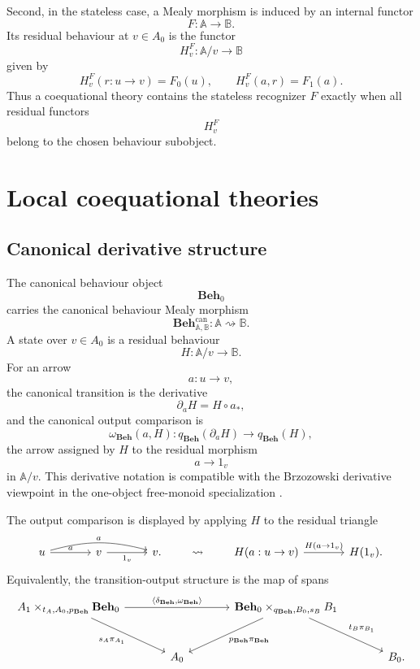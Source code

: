 Second, in the stateless case, a Mealy morphism is induced by an internal
functor
\[
    F:\mathbb A\to\mathbb B.
\]
Its residual behaviour at \(v\in A_0\) is the functor
\[
    H^F_v:\mathbb A/v\to\mathbb B
\]
given by
\[
    H^F_v(r:u\to v)=F_0(u),
    \qquad
    H^F_v(a,r)=F_1(a).
\]
Thus a coequational theory contains the stateless recognizer \(F\) exactly when
all residual functors
\[
    H^F_v
\]
belong to the chosen behaviour subobject.

\section{Local coequational theories}
\label{sec:local-coequational-theories}

\subsection{Canonical derivative structure}
\label{subsec:canonical-derivative-structure}

The canonical behaviour object
\[
    \mathbf{Beh}_0
\]
carries the canonical behaviour Mealy morphism
\[
    \mathbf{Beh}^{\mathrm{can}}_{\mathbb A,\mathbb B}:
    \mathbb A\rightsquigarrow\mathbb B.
\]
A state over \(v\in A_0\) is a residual behaviour
\[
    H:\mathbb A/v\to\mathbb B.
\]
For an arrow
\[
    a:u\to v,
\]
the canonical transition is the derivative
\[
    \partial_aH=H\circ a_*,
\]
and the canonical output comparison is
\[
    \omega_{\mathbf{Beh}}(a,H):
    q_{\mathbf{Beh}}(\partial_aH)\to q_{\mathbf{Beh}}(H),
\]
the arrow assigned by \(H\) to the residual morphism
\[
    a\to 1_v
\]
in \(\mathbb A/v\). This derivative notation is compatible with the
Brzozowski derivative viewpoint in the one-object free-monoid specialization
\cite{Brzozowski1964}.

The output comparison is displayed by applying \(H\) to the residual triangle
\[
\begin{tikzcd}[column sep=large, row sep=large]
    u
        \arrow[r, "a"]
        \arrow[rr, "a", bend left=15]
    &
    v
        \arrow[r, "1_v"']
    &
    v .
\end{tikzcd}
\qquad
\leadsto
\qquad
\begin{tikzcd}[column sep=large, row sep=large]
    H(a:u\to v)
        \arrow[r, "{H(a\to 1_v)}"]
    &
    H(1_v).
\end{tikzcd}
\]
Equivalently, the transition-output structure is the map of spans
\[
\begin{tikzcd}[column sep=large, row sep=large]
    A_1\times_{t_A,A_0,p_{\mathbf{Beh}}}\mathbf{Beh}_0
        \arrow[rr, "{\langle \delta_{\mathbf{Beh}},\omega_{\mathbf{Beh}}\rangle}"]
        \arrow[dr, "{s_A\pi_{A_1}}"']
    &&
    \mathbf{Beh}_0\times_{q_{\mathbf{Beh}},B_0,s_B}B_1
        \arrow[dl, "{p_{\mathbf{Beh}}\pi_{\mathbf{Beh}}}"]
        \arrow[dr, "{t_B\pi_{B_1}}"]
    \\
    &
    A_0
    &&
    B_0 .
\end{tikzcd}
\]

